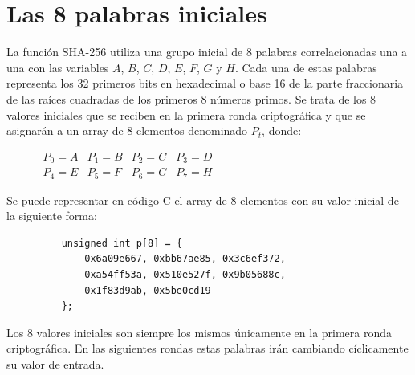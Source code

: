 \documentclass{article}
\begin{document}
\section{Las 8 palabras iniciales}
    La función SHA-256 utiliza una grupo inicial de 8 palabras correlacionadas una a una con las variables $A$, $B$, $C$, $D$, $E$, $F$, $G$ y $H$. Cada una de estas palabras representa los 32 primeros bits en hexadecimal o base 16 de la parte fraccionaria de las raíces cuadradas de los primeros 8 números primos. Se trata de los 8 valores iniciales que se reciben en la primera ronda criptográfica y que se asignarán a un array de 8 elementos denominado $P_{t}$, donde:
        \begin{figure}[H]
        \centering
            $\begin{array}{llll}
                P_{0} = A & P_{1} = B & P_{2} = C & P_{3} = D \\
                P_{4} = E & P_{5} = F & P_{6} = G & P_{7} = H
            \end{array}$
        \end{figure}
    
    Se puede representar en código C el array de 8 elementos con su valor inicial de la siguiente forma:
        \begin{figure}[H]
        \centering
            \begin{verbatim}
    unsigned int p[8] = {
    	0x6a09e667, 0xbb67ae85, 0x3c6ef372,
    	0xa54ff53a, 0x510e527f, 0x9b05688c,
    	0x1f83d9ab, 0x5be0cd19
    };
            \end{verbatim}
        \end{figure}
    
    Los 8 valores iniciales son siempre los mismos únicamente en la primera ronda criptográfica. En las siguientes rondas estas palabras irán cambiando cíclicamente su valor de entrada.
    
\end{document}
